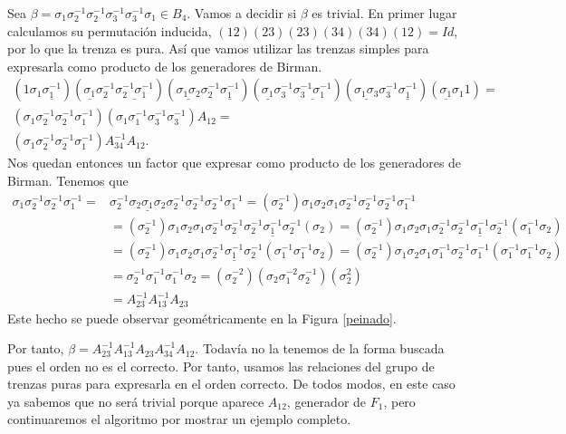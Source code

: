 \documentclass[TFG.tex]{subfiles}
\begin{document}
\begin{ej}
Sea $\beta=\sigma_1\sigma_2^{-1}\sigma_2^{-1}\sigma_3^{-1}\sigma_3^{-1}\sigma_1\in B_4$. Vamos a decidir si $\beta$ es trivial. En primer lugar calculamos su permutación inducida, $(12)(23)(23)(34)(34)(12)=Id$, por lo que la trenza es pura. Así que vamos utilizar las trenzas simples para expresarla como producto de los generadores de Birman. 
\begin{gather*}
(1\sigma_1\underline{\sigma_1^{-1}})(\underline{\sigma_1}\sigma_2^{-1}\underline{\sigma_2^{-1}\sigma_1^{-1}})(\underline{\sigma_1\sigma_2}\sigma_2^{-1}\underline{\sigma_1^{-1}})(\underline{\sigma_1}\sigma_3^{-1}\underline{\sigma_3^{-1}\sigma_1^{-1}})(\underline{\sigma_1\sigma_3}\sigma_3^{-1}\underline{\sigma_1^{-1}})(\underline{\sigma_1}\sigma_1 1)=\\
(\sigma_1\sigma_2^{-1}\sigma_2^{-1}\sigma_1^{-1})(\sigma_1\sigma_1^{-1}\sigma_3^{-1}\sigma_3^{-1})A_{12}=\\
(\sigma_1\sigma_2^{-1}\sigma_2^{-1}\sigma_1^{-1})A_{34}^{-1}A_{12}.
\end{gather*}
Nos quedan entonces un factor que expresar como producto de los generadores de Birman. Tenemos que 
\begin{align*}
\sigma_1\sigma_2^{-1}\sigma_2^{-1}\sigma_1^{-1}=& \sigma_2^{-1}\underline{\sigma_2\sigma_1\sigma_2}\sigma_2^{-1}\sigma_2^{-1}\sigma_2^{-1}\sigma_1^{-1}=(\sigma_2^{-1})\sigma_1\sigma_2\sigma_1\sigma_2^{-1}\sigma_2^{-1}\sigma_2^{-1}\sigma_1^{-1}\\
&=(\sigma_2^{-1})\sigma_1\sigma_2\sigma_1\sigma_2^{-1}\sigma_2^{-1}\underline{\sigma_2^{-1}\sigma_1^{-1}\sigma_2^{-1}}(\sigma_2)=(\sigma_2^{-1})\sigma_1\sigma_2\sigma_1\sigma_2^{-1}\underline{\sigma_2^{-1}\sigma_1^{-1}\sigma_2^{-1}}(\sigma_1^{-1}\sigma_2)\\
&=(\sigma_2^{-1})\sigma_1\sigma_2\sigma_1\underline{\sigma_2^{-1}\sigma_1^{-1}\sigma_2^{-1}}(\sigma_1^{-1}\sigma_1^{-1}\sigma_2)=(\sigma_2^{-1})\sigma_1\sigma_2\sigma_1\sigma_1^{-1}\sigma_2^{-1}\sigma_1^{-1}(\sigma_1^{-1}\sigma_1^{-1}\sigma_2)\\
&=\sigma_2^{-1}\sigma_1^{-1}\sigma_1^{-1}\sigma_2= (\sigma_2^{-2})(\sigma_2\sigma_1^{-2}\sigma_2^{-1})(\sigma_2^2)\\
&=A_{23}^{-1}A_{13}^{-1}A_{23}
\end{align*}
Este hecho se puede observar geométricamente en la Figura \ref{peinado}.

Por tanto, $\beta=A_{23}^{-1}A_{13}^{-1}A_{23}A_{34}^{-1}A_{12}$. Todavía no la tenemos de la forma buscada pues el orden no es el correcto. Por tanto, usamos las relaciones del grupo de trenzas puras para expresarla en el orden correcto. De todos modos, en este caso ya sabemos que no será trivial porque aparece $A_{12}$, generador de $F_1$, pero continuaremos el algoritmo por mostrar un ejemplo completo.


\end{ej}
\end{document}
